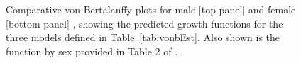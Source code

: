 \begin{figure}[htp]
\captionsetup[subfigure]{labelformat=empty}
\begin{center}
\newline
{}
\end{center}
\caption{Comparative von-Bertalanffy plots for male [top panel] and female [bottom panel] \fishname, showing the predicted growth functions for the three models defined in Table~\ref{tab:vonbEst}.  Also shown is the function by sex provided in Table 2 of \citet{arf2001}.}
\label{fig:vonbCompare}
\end{figure}

